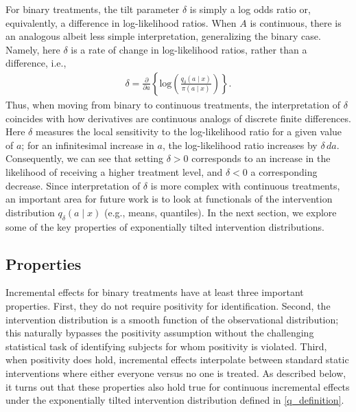 \documentclass[11pt,twoside]{article}
\theoremstyle{definition}
\theoremstyle{remark}
\begin{document}
For binary treatments, the tilt parameter $\delta$ is simply a log odds ratio or, equivalently, a difference in log-likelihood ratios. When $A$ is continuous, there is an analogous albeit less simple interpretation, generalizing the binary case. Namely, here $\delta$ is a rate of change in log-likelihood ratios, rather than a difference, i.e.,
\begin{align*}
    \delta = \frac{\partial}{\partial a} \left\{ \text{log}\left(\frac{q_\delta(a \mid x)}{\pi(a \mid x)} \right) \right\}.
\end{align*}
Thus, when moving from binary to continuous treatments, the interpretation of $\delta$ coincides with how derivatives are continuous analogs of discrete finite differences. %
Here $\delta$ measures the local sensitivity to the log-likelihood ratio for a given value of $a$; for an infinitesimal increase in $a$, the log-likelihood ratio increases by $\delta \, da$. Consequently, we can see that setting $\delta > 0$ corresponds to an increase in the likelihood of receiving a higher treatment level, and $\delta < 0$ a corresponding decrease. Since interpretation of $\delta$ is more complex with continuous treatments, an important area for future work is to look at functionals of the intervention distribution $q_\delta(a \mid x)$ (e.g., means, quantiles). In the next section, we explore some of the key properties of exponentially tilted intervention distributions. 

\subsection{Properties}

Incremental effects for binary treatments have at least three important properties. First, they do not require positivity for identification. Second, the intervention distribution is a smooth function of the observational distribution; this naturally bypasses the positivity assumption without the challenging statistical task of identifying subjects for whom positivity is violated. Third, when positivity does hold, incremental effects interpolate between standard static interventions where either everyone versus no one is treated. As described below, it turns out that these properties also hold true for continuous incremental effects under the exponentially tilted intervention distribution defined in \cref{q_definition}.
\end{document}
